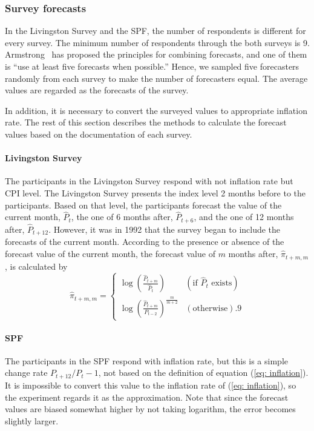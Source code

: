 \documentclass[../main.tex]{subfiles}
\begin{document}
\subsubsection{Survey forecasts}

In the Livingston Survey and the SPF, the number of respondents is different for every survey.
The minimum number of respondents through the both surveys is 9.
Armstrong~\cite{Armstrong2001} has proposed the principles for combining forecasts, and one of them is ``use at least five forecasts when possible.''
Hence, we sampled five forecasters randomly from each survey to make the number of forecasters equal.
The average values are regarded as the forecasts of the survey.

In addition, it is necessary to convert the surveyed values to appropriate inflation rate.
The rest of this section describes the methods to calculate the forecast values based on the documentation of each survey.

\paragraph{Livingston Survey}

The participants in the Livingston Survey respond with not inflation rate but CPI level.
The Livingston Survey presents the index level 2 months before to the participants.
Based on that level, the participants forecast the value of the current month, $\hat{P}_t$, the one of 6 months after, $\hat{P}_{t+6}$, and the one of 12 months after, $\hat{P}_{t+12}$.
However, it was in 1992 that the survey began to include the forecasts of the current month.
According to the presence or absence of the forecast value of the current month, the forecast value of $m$ months after, $\hat{\pi}_{t+m, m}$, is calculated by
\begin{equation}
  \hat{\pi}_{t+m, m} =
    \begin{cases}
      \log\left(\frac{\hat{P}_{t+m}}{\hat{P}_t}\right) & (\text{if } \hat{P}_t \text{ exists}) \\
      \log{\left(\frac{\hat{P}_{t+m}}{P_{t-2}}\right)}^{\frac{m}{m+2}} & (\text{otherwise}).9
    \end{cases}
\end{equation}

\paragraph{SPF}

The participants in the SPF respond with inflation rate, but this is a simple change rate $P_{t+12}/P_t -1$, not based on the definition of equation (\ref{eq: inflation}).
It is impossible to convert this value to the inflation rate of (\ref{eq: inflation}), so the experiment regards it as the approximation.
Note that since the forecast values are biased somewhat higher by not taking logarithm, the error becomes slightly larger.
\end{document}
